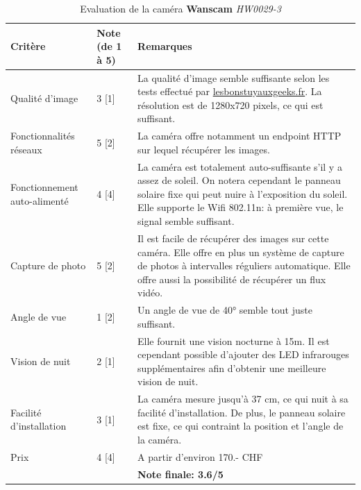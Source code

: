 \begin{table}[H]
    \centering
    \caption{Evaluation de la caméra \textbf{Wanscam} \textit{HW0029-3}}
    \label{cam:wan3_eval}
    \begin{tabular}{@{}llp{8cm}@{}}
        \toprule
        Critère                              & Note (de 1 à 5) & Remarques                                                                                                                                                                   \\ \midrule
        Qualité d'image              & 3 [1]               & La qualité d'image semble suffisante selon les tests effectué par \url{lesbonstuyauxgeeks.fr}\autocite{cam:wan3-test}. La résolution est de 1280x720 pixels, ce qui est suffisant. \\ [0.8ex]
        Fonctionnalités réseaux      & 5 [2]              & La caméra offre notamment un endpoint HTTP sur lequel récupérer les images.                                                                                                \\ [0.8ex]
        Fonctionnement auto-alimenté & 4 [4]              & La caméra est totalement auto-suffisante s'il y a assez de soleil. On notera cependant le panneau solaire fixe qui peut nuire à l'exposition du soleil. Elle supporte le Wifi 802.11n: à première vue, le signal semble suffisant.                   \\ [0.8ex]
        Capture de photo             & 5 [2]              & Il est facile de récupérer des images sur cette caméra. Elle offre en plus un système de capture de photos à intervalles réguliers automatique. Elle offre aussi la possibilité de récupérer un flux vidéo.                            \\ [0.8ex]
        Angle de vue                 & 1 [2]              & Un angle de vue de 40° semble tout juste suffisant.                                                                                                                        \\ [0.8ex]
        Vision de nuit               & 2 [1]               & Elle fournit une vision nocturne à 15m. Il est cependant possible d'ajouter des LED infrarouges supplémentaires afin d'obtenir une meilleure vision de nuit\autocite{cam:wan3-url}. \\ [0.8ex]
        Facilité d'installation      & 3 [1]              & La caméra mesure jusqu'à 37 cm, ce qui nuit à sa facilité d'installation. De plus, le panneau solaire est fixe, ce qui contraint la position et l'angle de la caméra.      \\ [0.8ex]
        Prix                         & 4 [4]              & A partir d'environ 170.- CHF \\ \midrule
        && \textbf{Note finale: 3.6/5} \\ \bottomrule
    \end{tabular}
\end{table}


